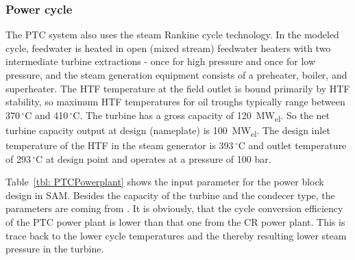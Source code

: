 \subsubsection{Power cycle}
The PTC system also uses the steam Rankine cycle technology. In the modeled cycle, feedwater is heated in open (mixed stream) feedwater heaters with two intermediate turbine extractions - once for high pressure and once for low pressure, and the steam generation equipment consists of a preheater, boiler, and superheater. The HTF temperature at the field outlet is bound primarily by HTF stability, so maximum HTF temperatures for oil troughs typically range between 370$\,^{\circ}\mathrm{C}$ and 410$\,^{\circ}\mathrm{C}$. The turbine has a gross capacity of 120~MW\textsubscript{el}. So the net turbine capacity output at design (nameplate) is 100~MW\textsubscript{el}. The design inlet temperature of the HTF in the steam generator is 393$\,^{\circ}\mathrm{C}$ and outlet temperature of 293$\,^{\circ}\mathrm{C}$ at design point and operates at a pressure of 100 bar.



Table~\ref{tbl: PTCPowerplant} shows the input parameter for the power block design in SAM. Besides the capacity of the turbine and the condecer type, the parameters are coming from \cite{Wagner2011}. It is obviously, that the cycle conversion efficiency of the PTC power plant is lower than that one from the CR power plant. This is trace back to the lower cycle temperatures and the thereby resulting lower steam pressure in the turbine.



